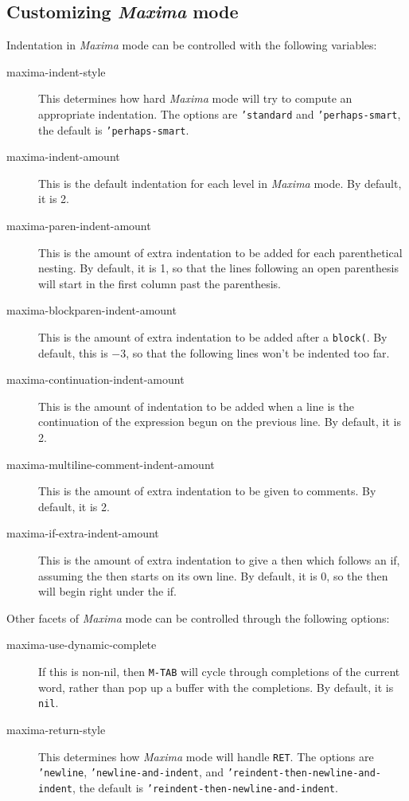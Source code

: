 \documentclass{article}
\newcommand{\mx}{\textsl{\sffamily Maxima}}
\begin{document}
\subsection{Customizing \mx{} mode}
\label{app:custmxmode}

Indentation in \mx{} mode can be controlled with the following
variables:
\begin{description}
\item[maxima-indent-style] This determines how hard \mx{} mode will
  try to compute an appropriate indentation.  The options are 
  \texttt{'standard} and \texttt{'perhaps-smart}, the default is
  \texttt{'perhaps-smart}.
\item[maxima-indent-amount] This is the default indentation for each
  level in \mx{} mode.  By default, it is 2.
\item[maxima-paren-indent-amount] This is the amount of extra
  indentation to be added for each parenthetical nesting.  By default,
  it is 1, so that the lines following an open parenthesis will start
  in the first column past the parenthesis.
\item[maxima-blockparen-indent-amount] This is the amount of extra
  indentation to be added after a \texttt{block(}.  By default, this
  is $-3$, so that the following lines won't be indented too far.
\item[maxima-continuation-indent-amount] This is the amount of
  indentation to be added when a line is the continuation of the
  expression begun on the previous line.  By default, it is 2.
\item[maxima-multiline-comment-indent-amount] This is the amount of
  extra indentation to be given to comments.  By default, it is 2.
\item[maxima-if-extra-indent-amount] This is the amount of extra
  indentation to give a then which follows an if, assuming the then
  starts on its own line.  By default, it is 0, so the then will begin
  right under the if.
\end{description}

Other facets of \mx{} mode can be controlled through the following
options: 
\begin{description}
\item[maxima-use-dynamic-complete] If this is non-nil, then
  \texttt{M-TAB} will cycle through completions of the current word,
  rather than pop up a buffer with the completions.  By default, it is
  \texttt{nil}.
\item[maxima-return-style] This determines how \mx{} mode will handle
  \texttt{RET}.  The options are \texttt{'newline},
  \texttt{'newline-and-indent}, and
  \texttt{'reindent-then-newline-and-indent}, the default is
  \texttt{'reindent-then-newline-and-indent}.
\end{description}
\end{document}
